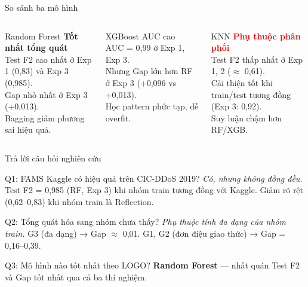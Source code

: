 \documentclass[aspectratio=169,12pt]{beamer}
\newcommand{\good}[1]{\textcolor{mygreen}{\textbf{#1}}}
\newcommand{\bad}[1]{\textcolor{red}{\textbf{#1}}}
\begin{document}
\begin{frame}{So sánh ba mô hình}
  \begin{columns}[T]
      \begin{block}{\centering Random Forest}
        \centering
        \good{Tốt nhất tổng quát}\\
        \vspace{0.3em}
        \small
        Test F2 cao nhất ở Exp 1 (0,83) và Exp 3 (0,985).\\
        Gap nhỏ nhất ở Exp 3 (+0,013).\\
        Bagging giảm phương sai hiệu quả.
      \end{block}
      \begin{block}{\centering XGBoost}
        \centering
        \textcolor{myorange}{AUC cao}\\
        \vspace{0.3em}
        \small
        AUC = 0,99 ở Exp 1, Exp 3.\\
        Nhưng Gap lớn hơn RF ở Exp 3 (+0,096 vs +0,013).\\
        Học pattern phức tạp, dễ overfit.
      \end{block}
      \begin{block}{\centering KNN}
        \centering
        \bad{Phụ thuộc phân phối}\\
        \vspace{0.3em}
        \small
        Test F2 thấp nhất ở Exp 1, 2 ($\approx$ 0,61).\\
        Cải thiện tốt khi train/test tương đồng (Exp 3: 0,92).\\
        Suy luận chậm hơn RF/XGB.
      \end{block}
  \end{columns}
\end{frame}

\begin{frame}{Trả lời câu hỏi nghiên cứu}
  \begin{block}{Q1: FAMS Kaggle có hiệu quả trên CIC-DDoS 2019?}
    \textit{Có, nhưng không đồng đều.} Test F2 = 0,985 (RF, Exp 3) khi nhóm train tương đồng với Kaggle. Giảm rõ rệt (0,62--0,83) khi nhóm train là Reflection.
  \end{block}
  \vspace{0.3em}
  \begin{block}{Q2: Tổng quát hóa sang nhóm chưa thấy?}
    \textit{Phụ thuộc tính đa dạng của nhóm train.} G3 (đa dạng) → Gap $\approx$ 0,01. G1, G2 (đơn điệu giao thức) → Gap = 0,16--0,39.
  \end{block}
  \vspace{0.3em}
  \begin{block}{Q3: Mô hình nào tốt nhất theo LOGO?}
    \textbf{Random Forest} --- nhất quán Test F2 và Gap tốt nhất qua cả ba thí nghiệm.
  \end{block}
\end{frame}
\end{document}
